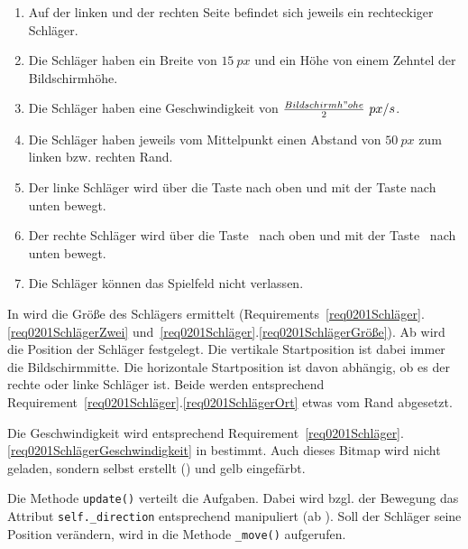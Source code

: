 \begin{enumerate}
	\item Auf der linken und der rechten Seite befindet sich jeweils ein rechteckiger Schläger.\label{req0201SchlägerZwei}
	\item Die Schläger haben ein Breite von $15~px$ und ein Höhe von einem Zehntel der Bildschirmhöhe.\label{req0201SchlägerGröße}
	\item Die Schläger haben eine Geschwindigkeit von $\frac{Bildschirmh"ohe}{2}~px/s$.\label{req0201SchlägerGeschwindigkeit}
	\item Die Schläger haben jeweils vom Mittelpunkt einen Abstand von $50~px$ zum linken bzw. rechten Rand.\label{req0201SchlägerOrt}
	\item Der linke Schläger wird über die Taste  nach oben und mit der Taste  nach unten bewegt.\label{req0201SchlägerTastenLinks}
	\item Der rechte Schläger wird über die Taste \UArrow\ nach oben und mit der Taste \DArrow\ nach unten bewegt.\label{req0201SchlägerTastenRechts}
	\item Die Schläger können das Spielfeld nicht verlassen.\label{req0201SchlägerGefangen}
\end{enumerate}
\er

In  wird die Größe des Schlägers ermittelt (Requirements~\ref{req0201Schläger}.\ref{req0201SchlägerZwei} und~\ref{req0201Schläger}.\ref{req0201SchlägerGröße}). Ab  wird die Position der Schläger festgelegt. Die vertikale Startposition ist dabei immer die Bildschirmmitte. Die horizontale Startposition ist davon abhängig, ob es der rechte oder linke Schläger ist. Beide werden entsprechend Requirement~\ref{req0201Schläger}.\ref{req0201SchlägerOrt} etwas vom Rand abgesetzt. 

Die Geschwindigkeit wird entsprechend Requirement~\ref{req0201Schläger}.\ref{req0201SchlägerGeschwindigkeit} in  bestimmt. Auch dieses Bitmap wird nicht geladen, sondern selbst erstellt () und gelb eingefärbt.


Die Methode \texttt{update()} verteilt die Aufgaben. Dabei wird bzgl. der Bewegung das Attribut \texttt{self.\_direction} entsprechend manipuliert (ab ). Soll der Schläger seine Position verändern, wird in  die Methode \texttt{\_move()} aufgerufen.

